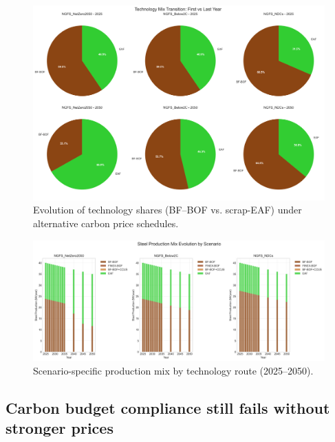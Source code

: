 \documentclass[preprint,1p,authoryear]{elsarticle}
\begin{document}
\begin{figure}[!t]
  \centering
  \includegraphics[width=0.8\linewidth]{technology_transition}
  \caption{Evolution of technology shares (BF--BOF vs. scrap-EAF) under alternative carbon price schedules.}
  \label{fig:technology-transition}
\end{figure}

\begin{figure}[!t]
  \centering
  \includegraphics[width=0.8\linewidth]{production_mix_evolution}
  \caption{Scenario-specific production mix by technology route (2025--2050).}
  \label{fig:production-mix}
\end{figure}

\subsection{Carbon budget compliance still fails without stronger prices}
\end{document}
